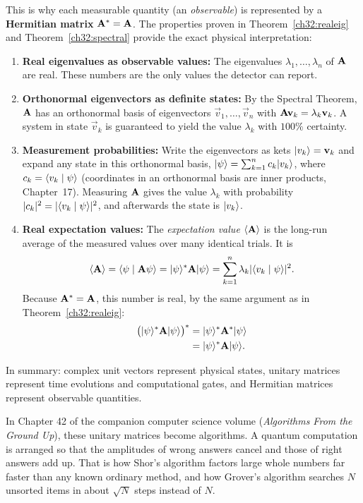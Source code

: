 This is why each measurable quantity (an \emph{observable}) is represented by a
\textbf{Hermitian matrix} $\mathbf{A}^* = \mathbf{A}$. The properties
proven in Theorem~\ref{ch32:realeig} and Theorem~\ref{ch32:spectral} provide the
exact physical interpretation:
\begin{enumerate}
  \item \textbf{Real eigenvalues as observable values:} The eigenvalues
  $\lambda_1, \dots, \lambda_n$ of $\mathbf{A}$ are real. These numbers are
  the only values the detector can report.
  \item \textbf{Orthonormal eigenvectors as definite states:} By the Spectral
  Theorem, $\mathbf{A}$ has an orthonormal basis of eigenvectors
  $\vec v_1, \dots, \vec v_n$ with $\mathbf{A}\mathbf{v}_k = \lambda_k\mathbf{v}_k$. A
  system in state $\vec v_k$ is guaranteed to yield the value $\lambda_k$ with
  $100\%$ certainty.
  \item \textbf{Measurement probabilities:} Write the eigenvectors as kets
  $\lvert v_k \rangle=\mathbf{v}_k$ and expand any state in this orthonormal basis,
  $\lvert \psi \rangle = \sum_{k=1}^n c_k \lvert v_k \rangle$, where $c_k = \langle v_k \mid \psi \rangle$
  (coordinates in an orthonormal basis are inner products, Chapter~17).
  Measuring $\mathbf{A}$ gives the value $\lambda_k$ with probability
  $\lvert c_k\rvert^2 = \lvert\langle v_k \mid \psi \rangle\rvert^2$, and afterwards the state is
  $\lvert v_k \rangle$.
  \item \textbf{Real expectation values:} The \emph{expectation value}
  $\langle \mathbf{A} \rangle$ is the long-run average of the measured values over
  many identical trials. It is
  \[
    \langle \mathbf{A} \rangle = \langle \psi \mid \mathbf{A}\psi \rangle = \lvert \psi \rangle^*\mathbf{A}\lvert \psi \rangle
    = \sum_{k=1}^n \lambda_k \lvert\langle v_k \mid \psi \rangle\rvert^2.
  \]
  Because $\mathbf{A}^* = \mathbf{A}$, this number is real, by the same argument as in
  Theorem~\ref{ch32:realeig}:
  \begin{align*}
    \bigl(\lvert \psi \rangle^*\mathbf{A}\lvert \psi \rangle\bigr)^* &= \lvert \psi \rangle^*\mathbf{A}^*\lvert \psi \rangle \\
    &= \lvert \psi \rangle^*\mathbf{A}\lvert \psi \rangle.
\end{align*}
\end{enumerate}

In summary: complex unit vectors represent physical states, unitary matrices represent time evolutions and
computational gates, and Hermitian matrices represent observable quantities.

In Chapter 42 of the companion computer science volume (\emph{Algorithms From the
Ground Up}), these unitary matrices become algorithms. A quantum computation is
arranged so that the amplitudes of wrong answers cancel and those of right answers
add up. That is how Shor's algorithm factors large whole numbers far faster than
any known ordinary method, and how Grover's algorithm searches $N$ unsorted items
in about $\sqrt N$ steps instead of $N$.


